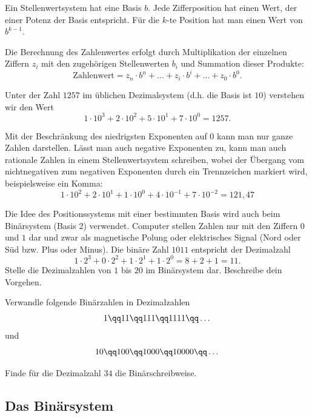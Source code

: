 \documentclass[%
11pt,%
twoside,%
titlepage,%
german,%
headsepline%
]{scrartcl}
\begin{document}
Ein Stellenwertsystem hat eine Basis $b$. Jede Zifferposition hat einen Wert, der einer Potenz der Basis entspricht. Für die $k$-te Position hat man einen Wert von $b^{k-1}$.

Die Berechnung des Zahlenwertes erfolgt durch Multiplikation der einzelnen Ziffern $z_i$ mit den zugehörigen Stellenwerten $b_i$ und Summation dieser Produkte:
$$\text{Zahlenwert} = z_n\cdot b^n+\dots+z_i\cdot b^i+\dots+z_0\cdot b^0.$$
\begin{bsp}
Unter der Zahl $1257$ im üblichen Dezimalsystem (d.h. die Basis ist $10$) verstehen wir den Wert
$$1\cdot10^3+2\cdot10^2+5\cdot10^1+7\cdot10^0 = 1257.$$
\end{bsp}

Mit der Beschränkung des niedrigsten Exponenten auf $0$ kann man nur ganze Zahlen darstellen. Lässt man auch negative Exponenten zu,
kann man auch rationale Zahlen in einem Stellenwertsystem schreiben, wobei der Übergang vom nichtnegativen zum negativen Exponenten durch ein Trennzeichen markiert wird, beispielsweise ein Komma:
$$1\cdot10^2+2\cdot10^1+1\cdot10^0+4\cdot10^{-1}+7\cdot10^{-2}=121,47$$

\begin{ueb}
Die Idee des Positionssystems mit einer bestimmten Basis wird auch beim Binärsystem
(Basis $2$) verwendet. Computer stellen Zahlen nur mit den Ziffern $0$ und $1$ dar und zwar als magnetische Polung oder elektrisches Signal (Nord oder Süd bzw. Plus oder Minus).
Die binäre Zahl $1011$ entspricht der Dezimalzahl
$$1\cdot2^3+0\cdot2^2+1\cdot2^1+1\cdot2^0=8+2+1=11.$$
Stelle die Dezimalzahlen von $1$ bis $20$ im Binärsystem dar. Beschreibe dein Vorgehen.
\end{ueb}
\begin{ueb}
Verwandle folgende Binärzahlen in Dezimalzahlen
$$1\qq11\qq111\qq1111\qq\dots$$
und
$$10\qq100\qq1000\qq10000\qq\dots$$
\end{ueb}
\begin{ueb}
Finde für die Dezimalzahl $34$ die Binärschreibweise.
\end{ueb}

\subsection{Das Binärsystem}
\end{document}
